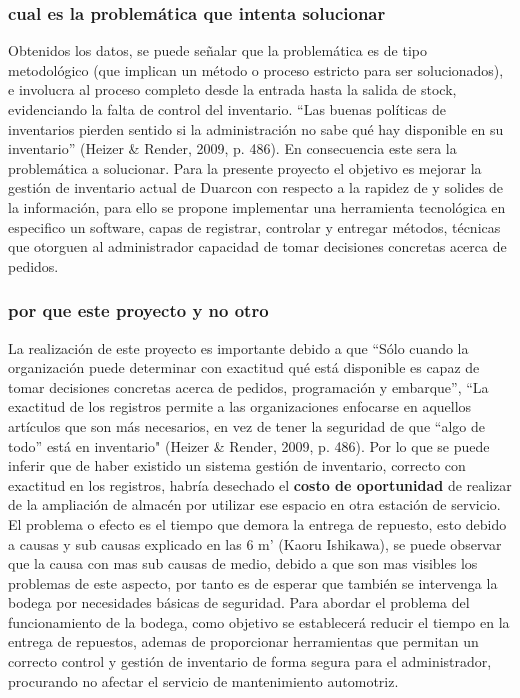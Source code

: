 \documentclass[a4papper,11pt]{article}
\begin{document}
    \subsubsection{cual es la problemática que intenta solucionar}
      Obtenidos los datos, se puede señalar que la problemática es de tipo metodológico (que implican un método o proceso estricto para ser solucionados), e involucra al proceso completo desde la entrada hasta la salida de stock, evidenciando la falta de control del inventario.
      “Las buenas políticas de inventarios pierden sentido si la administración no sabe qué hay disponible en su inventario” (Heizer & Render, 2009, p. 486). En consecuencia este sera la problemática a solucionar. Para la presente proyecto el objetivo es mejorar la gestión de inventario actual de Duarcon con respecto a la rapidez de y solides de la información, para ello se propone implementar una herramienta tecnológica en especifico un software, capas de registrar, controlar y entregar métodos, técnicas que otorguen al administrador capacidad de tomar decisiones concretas acerca de pedidos.

    \subsubsection{por que este proyecto y no otro}
      La realización de este proyecto es importante debido a que “Sólo cuando la organización puede determinar con exactitud qué está disponible es capaz de tomar decisiones concretas acerca de pedidos, programación y embarque”, “La exactitud de los registros permite a las organizaciones enfocarse en aquellos artículos que son más necesarios, en vez de tener la seguridad de que “algo de todo” está en inventario" (Heizer & Render, 2009, p. 486). Por lo que se puede inferir que de haber existido un sistema gestión de inventario, correcto con exactitud en los registros, habría desechado el \textbf{costo de oportunidad} de realizar de la ampliación de almacén por utilizar ese espacio en otra estación de servicio.
      El problema o efecto es el tiempo que demora la entrega de repuesto, esto debido a causas y sub causas explicado en las 6 m' (Kaoru Ishikawa), se puede observar que la causa con mas sub causas de medio, debido a que son mas visibles los problemas de este aspecto, por tanto es de esperar que también se intervenga la bodega por necesidades básicas de seguridad.
      Para abordar el problema del funcionamiento de la bodega, como objetivo se establecerá reducir el tiempo en la entrega de repuestos, ademas de proporcionar herramientas que permitan un correcto control y gestión de inventario de forma segura para el administrador, procurando no afectar el servicio de mantenimiento automotriz.
\end{document}
